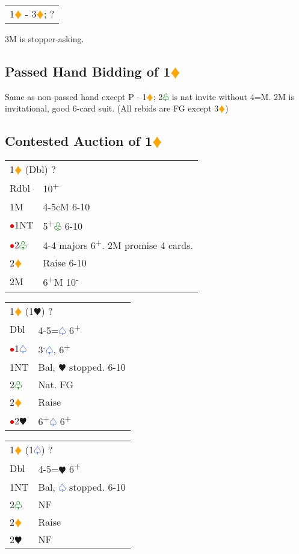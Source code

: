 \documentclass{article}
\renewcommand{\sp}{\textcolor{RoyalBlue}{$\varspade$}}
\newcommand{\he}{\textcolor{RubineRed}{$\varheart$}}
\newcommand{\di}{\textcolor{Orange}{$\vardiamond$}}
\newcommand{\cl}{\textcolor{Green}{$\varclub$}}
\newcommand{\nt}{\relsize{-1}NT\relsize{1}}
\newcommand{\up}{\textsuperscript{+}}
\newcommand{\down}{\textsuperscript{-}}
\newcommand{\al}{\textcolor{red}{$\bullet$}}
\begin{document}
\medskip

\begin{tabular}{|l|p{6.5cm}}
	\multicolumn{2}{l}{1\di{} - 3\di{}; ?}\\
\end{tabular}

3M is stopper-asking. 

\subsection{Passed Hand Bidding of 1\di{}}

Same as non passed hand except P - 1\di{}; 2\cl{} is nat invite without 4=M. 2M is invitational, good 6-card suit. (All rebids are FG except 3\di{})

\subsection{Contested Auction of 1\di{}}

\begin{tabular}{|l|p{6.5cm}}
	\multicolumn{2}{l}{1\di{} (Dbl) ?}\\
	Rdbl & 10\up \\
	1M & 4-5cM 6-10 \\
	\al{}1\nt & 5\up\cl{} 6-10 \\
	\al{}2\cl{} & 4-4 majors 6\up{}. 2M promise 4 cards.\\
	2\di{} & Raise 6-10 \\
	2M & 6\up{}M 10\down
\end{tabular}

\medskip

\begin{tabular}{|l|p{6.5cm}}
	\multicolumn{2}{l}{1\di{} (1\he{}) ?}\\
	Dbl & 4-5=\sp{} 6\up \\
	\al{}1\sp{} & 3\down\sp{}, 6\up\\
	1\nt & Bal, \he{} stopped. 6-10 \\
	2\cl{} & Nat. FG \\
	2\di{} & Raise \\
	\al{}2\he{}& 6\up\sp{} 6\up
\end{tabular}

\medskip

\begin{tabular}{|l|p{6.5cm}}
	\multicolumn{2}{l}{1\di{} (1\sp{}) ?}\\
	Dbl & 4-5=\he{} 6\up \\
	1\nt & Bal, \sp{} stopped. 6-10 \\
	2\cl{} & NF \\
	2\di{} & Raise \\
	2\he{} & NF \\
\end{tabular}
\end{document}
